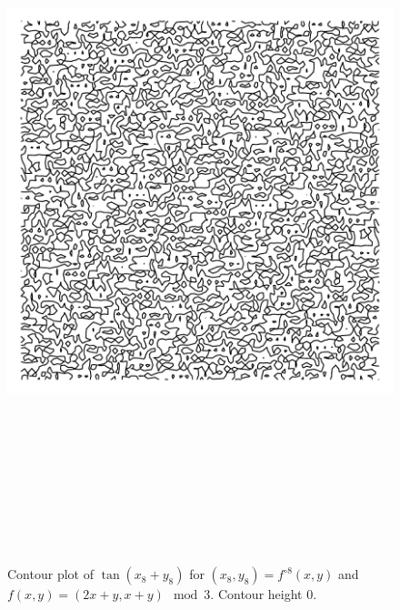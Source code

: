 \documentclass[12pt, a4paper]{amsart}
\begin{document}
\begin{figure}[!ht] 
\includegraphics[width=160mm, height=210mm]{arnolds_cat3.pdf}
\caption{
Contour plot of $\tan(x_8 + y_8)$ for $(x_8, y_8) = f^{\circ 8}(x, y)$ and  $f(x, y) = (2x + y, x + y) \mod 3$.
Contour height 0.
}
\end{figure}

\end{document}
